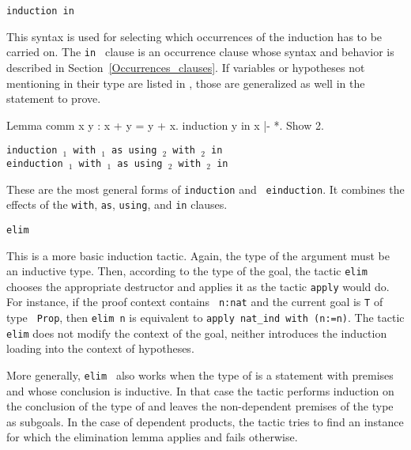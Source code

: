 \begin{coq_example*}
\begin{Variants}
\item \texttt{induction {\term} in {\occgoalset}}

  This syntax is used for selecting which occurrences of {\term} the
  induction has to be carried on. The {\tt in \occgoalset} clause is
  an occurrence clause whose syntax and behavior is described in
  Section~\ref{Occurrences_clauses}. If variables or hypotheses not
  mentioning {\term} in their type are listed in {\occgoalset}, those
  are generalized as well in the statement to prove.

\Example

\begin{coq_example}
Lemma comm x y : x + y = y + x.
induction y in x |- *.
Show 2.
\end{coq_example}

\item {\tt induction {\term$_1$} with {\bindinglist$_1$}
       as {\disjconjintropattern} %
       using {\term$_2$} with {\bindinglist$_2$} in {\occgoalset}}\\
     {\tt einduction {\term$_1$} with {\bindinglist$_1$}
       as {\disjconjintropattern} %
       using {\term$_2$} with {\bindinglist$_2$} in {\occgoalset}}

  These are the most general forms of {\tt induction} and {\tt
  einduction}.  It combines the effects of the {\tt with}, {\tt as}, %
  {\tt using}, and {\tt in} clauses.

\item {\tt elim \term}\label{elim}

  This is a more basic induction tactic.  Again, the type of the
  argument {\term} must be an inductive type. Then, according to
  the type of the goal, the tactic {\tt elim} chooses the appropriate
  destructor and applies it as the tactic {\tt apply}
  would do. For instance, if the proof context contains {\tt
  n:nat} and the current goal is {\tt T} of type {\tt
  Prop}, then {\tt elim n} is equivalent to {\tt apply nat\_ind with
  (n:=n)}.  The tactic {\tt elim} does not modify the context of
  the goal, neither introduces the induction loading into the context
  of hypotheses.

  More generally, {\tt elim \term} also works when the type of {\term}
  is a statement with premises and whose conclusion is inductive.  In
  that case the tactic performs induction on the conclusion of the
  type of {\term} and leaves the non-dependent premises of the type as
  subgoals.  In the case of dependent products, the tactic tries to
  find an instance for which the elimination lemma applies and fails
  otherwise.


\end{Variants}
\end{coq_example*}

